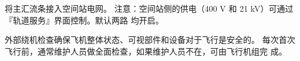 \documentclass[a4paper]{article}
\theoremstyle{definition}
\begin{document}




\vspace{0.75em}\hspace{1em}\parbox{\textwidth-1em}{将主汇流条接入空间站电网。
	注意：空间站侧的供电（400 V 和 21 kV）可通过
	『轨道服务』界面控制。默认两路
	均开启。}\vspace{0.75em}
	
	外部绕机检查确保飞机整体状态、可视部件和设备对于飞行是安全的。
	每次首次飞行前，通常维护人员做全面检查，如果维护人员不在，可由飞行机组完
	成。
	

\end{document}
